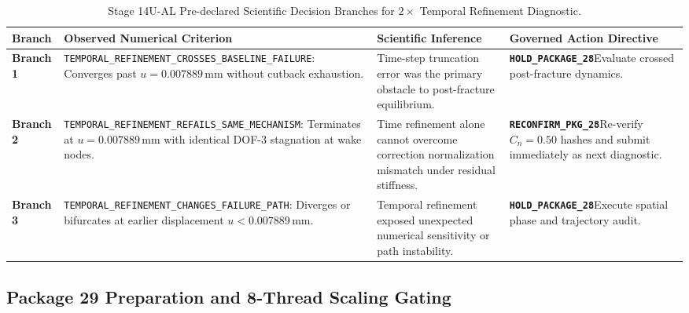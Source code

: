 \begin{table}[htbp]
\centering
\small
\caption{Stage 14U-AL Pre-declared Scientific Decision Branches for $2\times$ Temporal Refinement Diagnostic.}
\label{tab:stage14ual_decision_branches}
\begin{tabularx}{\textwidth}{l p{4.2cm} p{3.8cm} X}
\toprule
\textbf{Branch} & \textbf{Observed Numerical Criterion} & \textbf{Scientific Inference} & \textbf{Governed Action Directive} \\
\midrule
\textbf{Branch 1} & \texttt{TEMPORAL\_REFINEMENT\_\allowbreak CROSSES\_BASELINE\_FAILURE}: Converges past $u = 0.007889\,\mathrm{mm}$ without cutback exhaustion. & Time-step truncation error was the primary obstacle to post-fracture equilibrium. & \textbf{\texttt{HOLD\_PACKAGE\_28}}\newline Evaluate crossed post-fracture dynamics. \\
\midrule
\textbf{Branch 2} & \texttt{TEMPORAL\_REFINEMENT\_\allowbreak REFAILS\_SAME\_MECHANISM}: Terminates at $u = 0.007889\,\mathrm{mm}$ with identical DOF-3 stagnation at wake nodes. & Time refinement alone cannot overcome correction normalization mismatch under residual stiffness. & \textbf{\texttt{RECONFIRM\_PKG\_28}}\newline Re-verify $C_n = 0.50$ hashes and submit immediately as next diagnostic. \\
\midrule
\textbf{Branch 3} & \texttt{TEMPORAL\_REFINEMENT\_\allowbreak CHANGES\_FAILURE\_PATH}: Diverges or bifurcates at earlier displacement $u < 0.007889\,\mathrm{mm}$. & Temporal refinement exposed unexpected numerical sensitivity or path instability. & \textbf{\texttt{HOLD\_PACKAGE\_28}}\newline Execute spatial phase and trajectory audit. \\
\bottomrule
\end{tabularx}
\end{table}

\subsection{Package 29 Preparation and 8-Thread Scaling Gating}
\label{subsec:stage14ual_package29_preparation}

